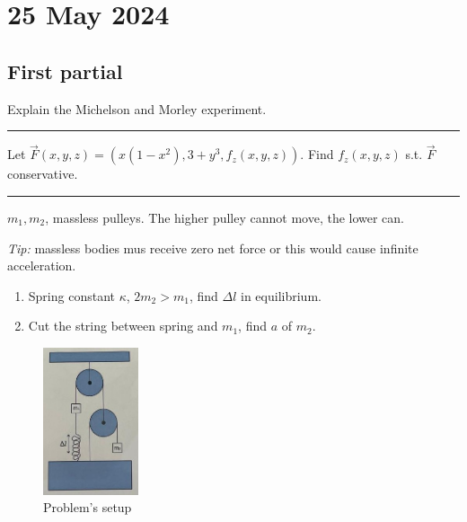 \documentclass[10pt]{extarticle}
\newcommand{\horizonalline}{\noindent\rule{\textwidth}{1pt}}
\begin{document}
\clearpage

\section{25 May 2024}
\subsection{First partial}

\begin{question}{}{}
    Explain the Michelson and Morley experiment.
\end{question}

\horizonalline

\begin{question}{}{}
    Let $\vec F(x, y, z) = \left(x(1-x^2), 3+y^3, f_z(x, y, z)\right)$. Find $f_z(x, y, z)$ s.t. $\vec F$ conservative.
\end{question}

\horizonalline

\begin{question}{}{}
    $m_1, m_2$, massless pulleys. The higher pulley cannot move, the lower can.

    \emph{Tip:} massless bodies mus receive zero net force or this would cause infinite acceleration.

    \begin{enumerate}
        \item Spring constant $\kappa$, $2m_2 > m_1$, find $\Delta l$ in equilibrium.
        \item Cut the string between spring and $m_1$, find $a$ of $m_2$.
    \end{enumerate}

    \begin{figure}[H]
        \centering
        \includegraphics[width=0.25\textwidth]{assets/S2_P2_PHY1_Exercises/25_may_24-ex1.jpg}
        \caption{Problem's setup}
    \end{figure}
\end{question}
\end{document}
